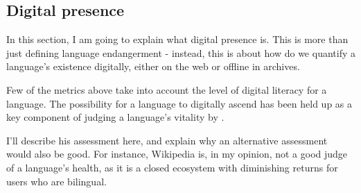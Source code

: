 


\subsection{Digital presence}



In this section, I am going to explain what digital presence is. This is more than just defining language endangerment - instead, this is about how do we quantify a language's existence digitally, either on the web or offline in archives.

Few of the metrics above take into account the level of digital literacy for a language. The possibility for a language to digitally ascend has been held up as a key component of judging a language's vitality by \citet{kornai2013digital}. %


I'll describe his assessment here, and explain why an alternative assessment would also be good. For instance, Wikipedia is, in my opinion, not a good judge of a language's health, as it is a closed ecosystem with diminishing returns for users who are bilingual.



